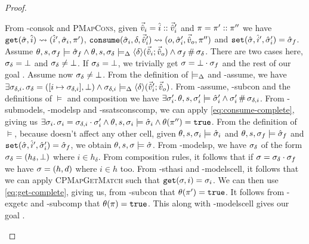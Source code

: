 \begin{proof}
\begin{hypvlist}
 From \hyp{consok} and \textsc{PMapCons}, given $\vec{\hat{v}}_i=\hat{i}::\vec{\hat{v}}_i'$ and $\pi=\pi'::\pi''$ we have $\texttt{get}(\hat{\sigma},\hat{i})\rightsquigarrow(\hat{i}', \hat{\sigma}_i, \pi')$, ${\texttt{consume}(\hat{\sigma}_i,\delta,\vec{\hat{v}}_i')\rightsquigarrow (o,\hat{\sigma}_i',\vec{\hat{v}}_o,\pi'')}$ and $\texttt{set}(\hat{\sigma},\hat{i}',\hat{\sigma}_i')=\hat{\sigma}_f$.
 Assume $\theta,s,\sigma_f\models \hat{\sigma}_f \land \theta, s, \sigma_\delta \models_{\Delta} \left<\delta\right>\!(\vec{\hat{v}}_i;\vec{\hat{v}}_o) \land \sigma_f\operatorname{\#}\sigma_\delta$.
 There are two cases here, $\sigma_\delta=\bot$ and $\sigma_\delta\neq\bot$. If $\sigma_\delta=\bot$, we trivially get $\sigma=\bot\cdot\sigma_f$ and the rest of our goal .
 Assume now $\sigma_\delta\neq\bot$. From the definition of $\models_{\Delta}$ and \hyp{assume}, we have $\exists \sigma_{\delta,i}\ldotp {\sigma_\delta=([i\mapsto\sigma_{\delta,i}],\bot)} \land \sigma_{\delta,i}\models_{\Delta} \left<\delta\right>\!(\vec{\hat{v}}_i';\vec{\hat{v}}_o)$.
 From \hyp{assume}, \hyp{subcon} and the definitions of $\models$  and composition we have $\exists \sigma_i'\ldotp {\theta,s,\sigma_i'\models\hat{\sigma}_i'} \land \sigma_i' \operatorname{\#} \sigma_{\delta,i}$.
 From \hyp{submodels}, \hyp{modelsp} and \hyp{ssatsconscomp}, we can apply \ref{eq:consume-complete}, giving us $\exists \sigma_i\ldotp {\sigma_i=\sigma_{\delta,i}\cdot\sigma_i'} \land \theta,s,\sigma_i\models \hat{\sigma}_i \land \theta(\pi'')=\texttt{true}$.
 From the definition of $\models$, because \consume{} doesn't affect any other cell, given ${\theta,s,\sigma_i\models\hat{\sigma}_i}$ and $\theta,s,\sigma_f\models\hat{\sigma}_f$ and $\texttt{set}(\hat{\sigma},\hat{i}',\hat{\sigma}_i')=\hat{\sigma}_f$, we obtain $\theta,s,\sigma\models\hat{\sigma}$.
 From \hyp{modelsp}, we have $\sigma_\delta$ of the form $\sigma_\delta=(h_\delta,\bot)$ where $i\in h_\delta$. From composition rules, it follows that if $\sigma=\sigma_\delta\cdot\sigma_f$ we have $\sigma=(h,d)$ where $i\in h$ too.
 From \hyp{sthasi} and \hyp{modelscell}, it follows that we can apply \textsc{CPMapGetMatch} such that ${\texttt{get}(\sigma,i)=\sigma_i}$. We can then use \ref{eq:get-complete}, giving us, from \hyp{subcon} that $\theta(\pi')=\texttt{true}$.
 It follows from \hyp{exgetc} and \hyp{subcomp} that $\theta(\pi)=\texttt{true}$. This along with \hyp{modelscell} gives our goal .
\end{hypvlist}

\pfcase{$\delta = \domainset$}


\end{proof}
